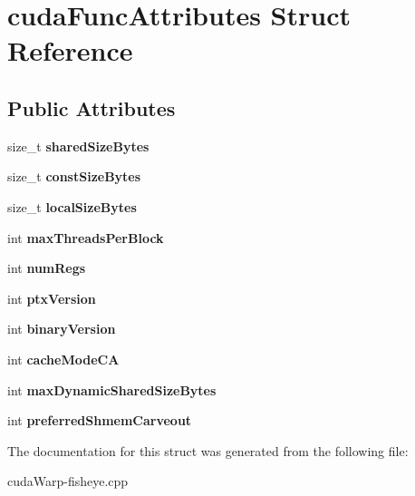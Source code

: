 \hypertarget{structcudaFuncAttributes}{}\section{cuda\+Func\+Attributes Struct Reference}
\label{structcudaFuncAttributes}
\subsection*{Public Attributes}
\begin{DoxyCompactItemize}
\item 
size\+\_\+t {\bfseries shared\+Size\+Bytes}\hypertarget{structcudaFuncAttributes_ac3bc6914df6f65ac08b1f53cd7276113}{}\label{structcudaFuncAttributes_ac3bc6914df6f65ac08b1f53cd7276113}

\item 
size\+\_\+t {\bfseries const\+Size\+Bytes}\hypertarget{structcudaFuncAttributes_afe17485a8cbe9034eb2b7905d2d82ef8}{}\label{structcudaFuncAttributes_afe17485a8cbe9034eb2b7905d2d82ef8}

\item 
size\+\_\+t {\bfseries local\+Size\+Bytes}\hypertarget{structcudaFuncAttributes_a8415fcfcab196c9e01dacb03c8ca8eae}{}\label{structcudaFuncAttributes_a8415fcfcab196c9e01dacb03c8ca8eae}

\item 
int {\bfseries max\+Threads\+Per\+Block}\hypertarget{structcudaFuncAttributes_ab8350f491105f159ff684f5c59167af0}{}\label{structcudaFuncAttributes_ab8350f491105f159ff684f5c59167af0}

\item 
int {\bfseries num\+Regs}\hypertarget{structcudaFuncAttributes_a3e750723dd84185e838039c82931baf3}{}\label{structcudaFuncAttributes_a3e750723dd84185e838039c82931baf3}

\item 
int {\bfseries ptx\+Version}\hypertarget{structcudaFuncAttributes_a08ce97bd1e77d84cbff1cea9d662dcc2}{}\label{structcudaFuncAttributes_a08ce97bd1e77d84cbff1cea9d662dcc2}

\item 
int {\bfseries binary\+Version}\hypertarget{structcudaFuncAttributes_ac4b0a26a83cff2a60183f6fbb8944907}{}\label{structcudaFuncAttributes_ac4b0a26a83cff2a60183f6fbb8944907}

\item 
int {\bfseries cache\+Mode\+CA}\hypertarget{structcudaFuncAttributes_ac5b4f9e473bf54747f2035df401577c7}{}\label{structcudaFuncAttributes_ac5b4f9e473bf54747f2035df401577c7}

\item 
int {\bfseries max\+Dynamic\+Shared\+Size\+Bytes}\hypertarget{structcudaFuncAttributes_a4e4e85e7111f39739d38fb7c6fe26a42}{}\label{structcudaFuncAttributes_a4e4e85e7111f39739d38fb7c6fe26a42}

\item 
int {\bfseries preferred\+Shmem\+Carveout}\hypertarget{structcudaFuncAttributes_a088f144760311325523b66ee90c83c51}{}\label{structcudaFuncAttributes_a088f144760311325523b66ee90c83c51}

\end{DoxyCompactItemize}


The documentation for this struct was generated from the following file\+:\begin{DoxyCompactItemize}
\item 
cuda\+Warp-\/fisheye.\+cpp\end{DoxyCompactItemize}
